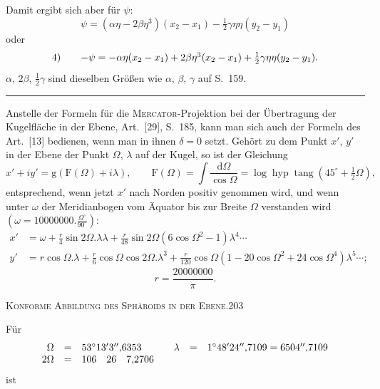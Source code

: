 Damit ergibt sich aber für $\psi$:
\[
\psi=(\alpha\eta-2\beta\eta^3)(x_2-x_1)-\tfrac12\gamma\eta\eta(y_2-y_1)
\]
oder
\[
\begin{array}{r@{\qquad}l}
4)&-\psi=-\alpha\eta(x_2-x_1)+2\beta\eta^3(x_2-x_1)+\tfrac12\gamma\eta\eta(y_2-y_1).
\end{array}
\]
$\alpha$, $2\beta$, $\tfrac12\gamma$ sind dieselben Größen wie $\alpha$, $\beta$, $\gamma$ auf S.~159.
\begin{center}\rule{4cm}{.4pt}\end{center}
\bigskip
Anstelle der Formeln für die \textsc{Mercator}-Projektion bei der Übertragung der Kugelfläche in der Ebene, Art.~[29], S.~185, kann man sich auch der Formeln des Art.~[13] bedienen, wenn man in ihnen $\delta=0$ setzt. Gehört zu dem Punkt $x'$, $y'$ in der Ebene der Punkt $\Omega$, $\lambda$ auf der Kugel, so ist der Gleichung
\[
x'+iy'=\mathrm g(\mathrm F(\Omega)+i\lambda),\qquad
\mathrm F(\Omega)=\int\frac{\mathrm d\Omega}{\cos\Omega}
=\log\operatorname{hyp}\operatorname{tang}(45^\circ+\tfrac12\Omega),
\]
entsprechend, wenn jetzt $x'$ nach Norden positiv genommen wird, und wenn unter $\omega$ der Meridianbogen vom Äquator bis zur Breite $\Omega$ verstanden wird $\left(\omega=10000000.\frac{\Omega^\circ}{90^\circ}\right)$:
\[
\begin{aligned}
x'&=\omega+\frac r4\sin2\Omega.\lambda\lambda+\frac r{48}\sin2\Omega(6\cos\Omega^2-1)\lambda^4\cdots\\
y'&=r\cos\Omega.\lambda+\frac r6\cos\Omega\cos2\Omega.\lambda^3
+\frac r{120}\cos\Omega(1-20\cos\Omega^2+24\cos\Omega^4)\lambda^5\cdots;
\end{aligned}
\]
\[
r=\frac{20000000}{\pi}.
\]
\par\endgroup
\clearpage
\noindent\mbox{}\hfill\textsc{Konforme Abbildung des Sphäroids in der Ebene.}\hfill203\par\medskip
\begingroup\footnotesize
Für
\[
\begin{array}{rcl@{\qquad}rcl}
\Omega&=&53^\circ13'3''{,}6353&\lambda&=&1^\circ48'24''{,}7109=6504''{,}7109\\
2\Omega&=&106\quad26\quad7{,}2706&&&
\end{array}
\]
ist
